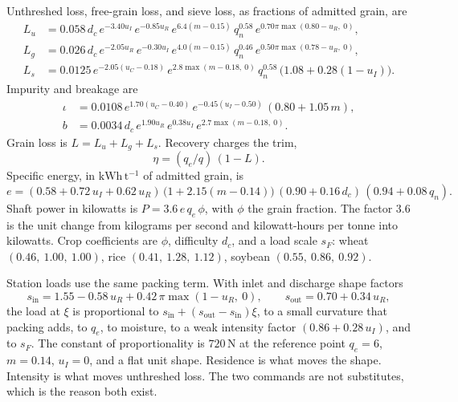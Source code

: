 Unthreshed loss, free-grain loss, and sieve loss, as fractions of admitted grain, are
\begin{align}
L_u &= 0.058\, d_c\, e^{-3.40 u_I}\, e^{-0.85 u_R}\, e^{6.4(m-0.15)}\, q_n^{0.58}\,
        e^{0.70\pi \max(0.80-u_R,\ 0)}, \label{eq:lu}\\
L_g &= 0.026\, d_c\, e^{-2.05 u_R}\, e^{-0.30 u_I}\, e^{4.0(m-0.15)}\, q_n^{0.46}\,
        e^{0.50\pi \max(0.78-u_R,\ 0)}, \label{eq:lg}\\
L_s &= 0.0125\, e^{-2.05(u_C-0.18)}\, e^{2.8\max(m-0.18,\ 0)}\, q_n^{0.58}\,
        \big(1.08+0.28(1-u_I)\big). \label{eq:ls}
\end{align}
Impurity and breakage are
\begin{align}
\iota &= 0.0108\, e^{1.70(u_C-0.40)}\, e^{-0.45(u_I-0.50)}\, (0.80+1.05\,m), \label{eq:iota}\\
b &= 0.0034\, d_c\, e^{1.90 u_R}\, e^{0.38 u_I}\, e^{2.7\max(m-0.18,\ 0)}. \label{eq:b}
\end{align}
Grain loss is \(L=L_u+L_g+L_s\). Recovery charges the trim,
\begin{equation}
\eta = (q_e/q)\,(1-L).
\label{eq:eta}
\end{equation}
Specific energy, in \(\mathrm{kWh\,t^{-1}}\) of admitted grain, is
\begin{equation}
e = (0.58 + 0.72\,u_I + 0.62\,u_R)\,
    \big(1+2.15(m-0.14)\big)\,
    (0.90+0.16\,d_c)\,
    (0.94+0.08\,q_n).
\label{eq:energy}
\end{equation}
Shaft power in kilowatts is \(P = 3.6\, e\, q_e\, \phi\), with \(\phi\) the grain fraction. The factor \(3.6\) is the unit change from kilograms per second and kilowatt-hours per tonne into kilowatts. Crop coefficients are \(\phi\), difficulty \(d_c\), and a load scale \(s_F\): wheat \((0.46,\ 1.00,\ 1.00)\), rice \((0.41,\ 1.28,\ 1.12)\), soybean \((0.55,\ 0.86,\ 0.92)\).

Station loads use the same packing term. With inlet and discharge shape factors
\begin{equation}
s_{\mathrm{in}} = 1.55 - 0.58\,u_R + 0.42\,\pi\max(1-u_R,\ 0),
\qquad
s_{\mathrm{out}} = 0.70 + 0.34\,u_R,
\label{eq:shapeends}
\end{equation}
the load at \(\xi\) is proportional to
\(s_{\mathrm{in}}+(s_{\mathrm{out}}-s_{\mathrm{in}})\xi\), to a small curvature that packing adds, to \(q_e\), to moisture, to a weak intensity factor \((0.86+0.28\,u_I)\), and to \(s_F\). The constant of proportionality is \(720\,\mathrm{N}\) at the reference point \(q_e=6\), \(m=0.14\), \(u_I=0\), and a flat unit shape. Residence is what moves the shape. Intensity is what moves unthreshed loss. The two commands are not substitutes, which is the reason both exist.

